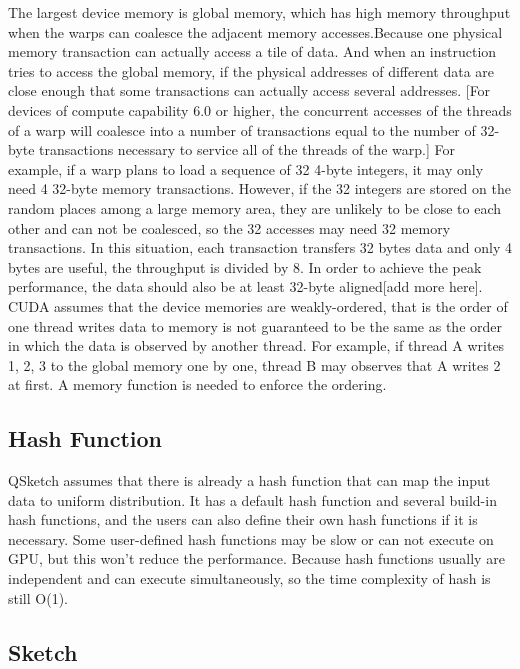 \documentclass[conference]{IEEEtran}
\begin{document}
The largest device memory is global memory, which has high memory throughput when the warps can coalesce the adjacent memory accesses.Because one physical memory transaction can actually access a tile of data. And when an instruction tries to access the global memory, if the physical addresses of different data are close enough that some transactions can actually access several addresses. [For devices of compute capability 6.0 or higher, the concurrent accesses of the threads of a warp will coalesce into a number of transactions equal to the number of 32-byte transactions necessary to service all of the threads of the warp.]  For example, if a warp plans to load a sequence of 32 4-byte integers, it may only need 4 32-byte memory transactions. However, if the 32 integers are stored on the random places among a large memory area, they are unlikely to be close to each other and can not be coalesced, so the 32 accesses may need 32 memory transactions. In this situation, each transaction transfers 32 bytes data and only 4 bytes are useful, the throughput is divided by 8. In order to achieve the peak performance, the data should also be at least 32-byte aligned[add more here]. 
CUDA assumes that the device memories are weakly-ordered, that is the order of one thread writes data to memory is not guaranteed to be the same as the order in which the data is observed by another thread. For example, if thread A writes 1, 2, 3 to the global memory one by one, thread B may observes that A writes 2 at first. A memory function is needed to enforce the ordering. 
\subsection{Hash Function}
QSketch assumes that there is already a hash function that can map the input data to uniform distribution. It has a default hash function and several build-in hash functions, and the users can also define their own hash functions if it is necessary. Some user-defined hash functions may be slow or can not execute on GPU, but this won't reduce the performance. Because hash functions usually are independent and can execute simultaneously, so the time complexity of hash is still O(1).
\subsection{Sketch}
\end{document}
